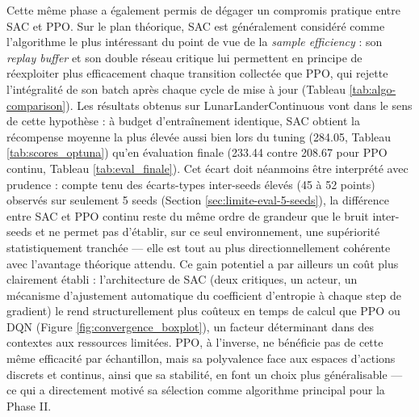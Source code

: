 Cette même phase a également permis de dégager un compromis pratique entre SAC et PPO. Sur le plan théorique, SAC est généralement considéré comme l'algorithme le plus intéressant du point de vue de la \textit{sample efficiency} : son \textit{replay buffer} et son double réseau critique lui permettent en principe de réexploiter plus efficacement chaque transition collectée que PPO, qui rejette l'intégralité de son batch après chaque cycle de mise à jour (Tableau \ref{tab:algo-comparison}). Les résultats obtenus sur LunarLanderContinuous vont dans le sens de cette hypothèse : à budget d'entraînement identique, SAC obtient la récompense moyenne la plus élevée aussi bien lors du tuning (284.05, Tableau \ref{tab:scores_optuna}) qu'en évaluation finale (233.44 contre 208.67 pour PPO continu, Tableau \ref{tab:eval_finale}). Cet écart doit néanmoins être interprété avec prudence : compte tenu des écarts-types inter-seeds élevés (45 à 52 points) observés sur seulement 5 seeds (Section \ref{sec:limite-eval-5-seeds}), la différence entre SAC et PPO continu reste du même ordre de grandeur que le bruit inter-seeds et ne permet pas d'établir, sur ce seul environnement, une supériorité statistiquement tranchée — elle est tout au plus directionnellement cohérente avec l'avantage théorique attendu. Ce gain potentiel a par ailleurs un coût plus clairement établi : l'architecture de SAC (deux critiques, un acteur, un mécanisme d'ajustement automatique du coefficient d'entropie à chaque step de gradient) le rend structurellement plus coûteux en temps de calcul que PPO ou DQN (Figure \ref{fig:convergence_boxplot}), un facteur déterminant dans des contextes aux ressources limitées. PPO, à l'inverse, ne bénéficie pas de cette même efficacité par échantillon, mais sa polyvalence face aux espaces d'actions discrets et continus, ainsi que sa stabilité, en font un choix plus généralisable — ce qui a directement motivé sa sélection comme algorithme principal pour la Phase II.

